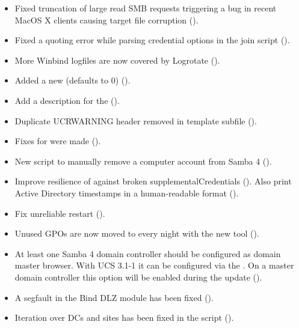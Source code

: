 \begin{itemize}
\item Fixed truncation of large read SMB requests triggering a bug in
  recent MacOS X clients causing target file corruption
  ().
\item Fixed a quoting error while parsing credential options in the
  join script ().
\item More Winbind logfiles are now covered by Logrotate ().
\item Added a new  (defaults to 0) ().
\item Add a description for the 
  ().
\item Duplicate UCRWARNING header removed in 
  template subfile ().
\item Fixes for  were made
  ().
\item New script  to manually remove a
  computer account from Samba 4 ().
\item Improve resilience of  against broken
  supplementalCredentials (). Also print Active
  Directory timestamps in a human-readable format ().
\item Fix unreliable  restart ().
\item Unused GPOs are now moved to 
every night with the new tool
().
\item At least one Samba 4 domain controller should be configured as domain master browser.
With UCS 3.1-1 it can be configured via the . On a 
master domain controller this option will be enabled during the update ().
\item A segfault in the Bind DLZ module has been fixed ().
\item Iteration over DCs and sites has been fixed in the
   script
  ().
\end{itemize}

